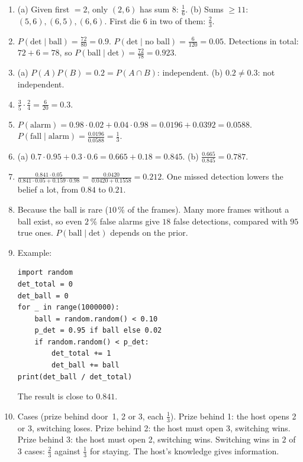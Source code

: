 \begin{enumerate}[label=\textbf{\ansnum.\arabic*}]
  \item (a) Given first $=2$, only $(2,6)$ has sum $8$: $\frac16$. (b) Sums $\ge11$: $(5,6),(6,5),(6,6)$. First die $6$ in two of them: $\frac23$.
  \item $P(\text{det}\mid\text{ball})=\frac{72}{80}=0.9$. $P(\text{det}\mid\text{no ball})=\frac6{120}=0.05$. Detections in total: $72+6=78$, so $P(\text{ball}\mid\text{det})=\frac{72}{78}=0.923$.
  \item (a) $P(A)P(B)=0.2=P(A\cap B)$: independent. (b) $0.2\ne0.3$: not independent.
  \item $\frac35\cdot\frac24=\frac{6}{20}=0.3$.
  \item $P(\text{alarm})=0.98\cdot0.02+0.04\cdot0.98=0.0196+0.0392=0.0588$. $P(\text{fall}\mid\text{alarm})=\frac{0.0196}{0.0588}=\frac13$.
  \item (a) $0.7\cdot0.95+0.3\cdot0.6=0.665+0.18=0.845$. (b) $\frac{0.665}{0.845}=0.787$.
  \item $\frac{0.841\cdot0.05}{0.841\cdot0.05+0.159\cdot0.98}=\frac{0.0420}{0.0420+0.1558}=0.212$. One missed detection lowers the belief a lot, from $0.84$ to $0.21$.
  \item Because the ball is rare ($10\,\%$ of the frames). Many more frames without a ball exist, so even $2\,\%$ false alarms give $18$ false detections, compared with $95$ true ones. $P(\text{ball}\mid\text{det})$ depends on the prior.
  \item Example:
\begin{verbatim}
import random
det_total = 0
det_ball = 0
for _ in range(1000000):
    ball = random.random() < 0.10
    p_det = 0.95 if ball else 0.02
    if random.random() < p_det:
        det_total += 1
        det_ball += ball
print(det_ball / det_total)
\end{verbatim}
  The result is close to $0.841$.
  \item[\textbf{\ansnum.10}] Cases (prize behind door~1, 2 or 3, each $\frac13$). Prize behind 1: the host opens 2 or 3, switching loses. Prize behind 2: the host must open 3, switching wins. Prize behind 3: the host must open 2, switching wins. Switching wins in $2$ of $3$ cases: $\frac23$ against $\frac13$ for staying. The host's knowledge gives information.
\end{enumerate}
